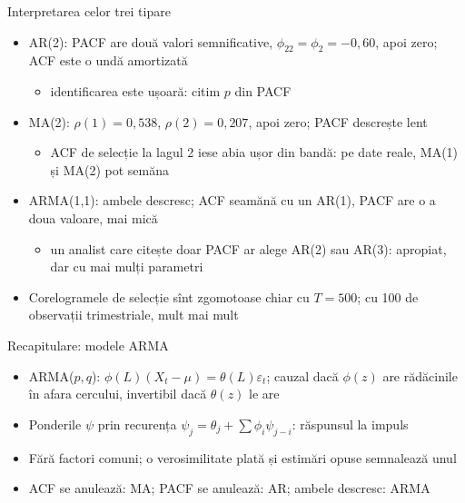 \begin{frame}{Interpretarea celor trei tipare}
\itemsize{\small}
\begin{itemize}
    \item AR(2): PACF are două valori semnificative, $\phi_{22} = \phi_2 = \ensuremath{-}0{,}60$, apoi zero; ACF este o undă amortizată
    \begin{itemize}
        \item identificarea este ușoară: citim $p$ din PACF
    \end{itemize}
    \item MA(2): $\rho(1) = 0{,}538$, $\rho(2) = 0{,}207$, apoi zero; PACF descrește lent
    \begin{itemize}
        \item ACF de selecție la lagul 2 iese abia ușor din bandă: pe date reale, MA(1) și MA(2) pot semăna
    \end{itemize}
    \item ARMA(1,1): ambele descresc; ACF seamănă cu un AR(1), PACF are o a doua valoare, mai mică
    \begin{itemize}
        \item un analist care citește doar PACF ar alege AR(2) sau AR(3): apropiat, dar cu mai mulți parametri
    \end{itemize}
    \item Corelogramele de selecție sînt zgomotoase chiar cu $T = 500$; cu 100 de observații trimestriale, mult mai mult
\end{itemize}
\end{frame}

\begin{frame}{Recapitulare: modele ARMA}
\itemsize{\small}
\begin{itemize}
    \item ARMA($p,q$): $\phi(L)(X_t - \mu) = \theta(L)\varepsilon_t$; cauzal dacă $\phi(z)$ are rădăcinile în afara cercului, invertibil dacă $\theta(z)$ le are
    \item Ponderile $\psi$ prin recurența $\psi_j = \theta_j + \sum\phi_i\psi_{j-i}$: răspunsul la impuls
    \item Fără factori comuni; o verosimilitate plată și estimări opuse semnalează unul
    \item ACF se anulează: MA; PACF se anulează: AR; ambele descresc: ARMA
\end{itemize}
\end{frame}


